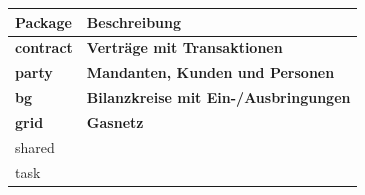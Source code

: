\begin{tabular}{l|l}
\hline
\rowcolor{head}\textbf{Package} & \textbf{Beschreibung} \\
\hline
\textbf{contract} & \textbf{Verträge mit Transaktionen} \\
\rowcolor{odd} \textbf{party} & \textbf{Mandanten, Kunden und Personen} \\
\textbf{bg}    & \textbf{Bilanzkreise mit Ein-/Ausbringungen} \\
\rowcolor{odd} \textbf{grid}  & \textbf{Gasnetz} \\
shared &  \\
\rowcolor{odd} task  &  \\
\end{tabular}%
